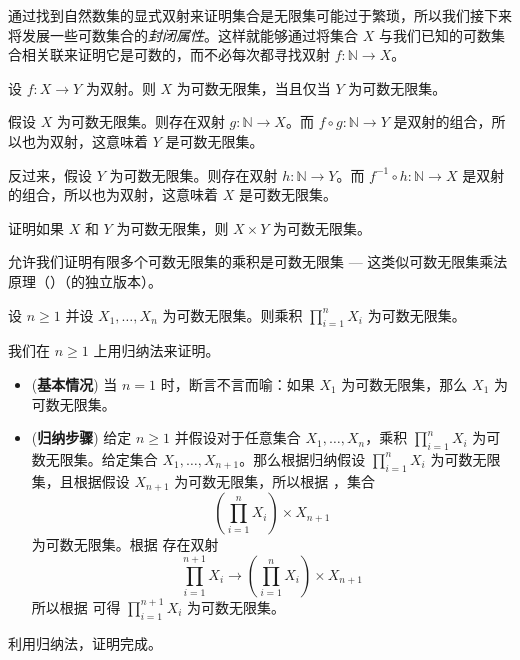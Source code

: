 通过找到自然数集的显式双射来证明集合是无限集可能过于繁琐，所以我们接下来将发展一些可数集合的\textit{封闭属性}。这样就能够通过将集合 $X$ 与我们已知的可数集合相关联来证明它是可数的，而不必每次都寻找双射 $f : \mathbb{N} \to X$。

\begin{proposition}
\label{propCountablyInfiniteFromBijection}
设 $f : X \to Y$ 为双射。则 $X$ 为可数无限集，当且仅当 $Y$ 为可数无限集。
\end{proposition}

\begin{cproof}
假设 $X$ 为可数无限集。则存在双射 $g : \mathbb{N} \to X$。而 $f \circ g : \mathbb{N} \to Y$ 是双射的组合，所以也为双射，这意味着 $Y$ 是可数无限集。

反过来，假设 $Y$ 为可数无限集。则存在双射 $h : \mathbb{N} \to Y$。而 $f^{-1} \circ h : \mathbb{N} \to X$ 是双射的组合，所以也为双射，这意味着 $X$ 是可数无限集。
\end{cproof}

\begin{exercise}
证明如果 $X$ 和 $Y$ 为可数无限集，则 $X \times Y$ 为可数无限集。
\end{exercise}

 允许我们证明有限多个可数无限集的乘积是可数无限集 --- 这类似可数无限集乘法原理（）（的独立版本）。

\begin{proposition}[有限多个可数集合的乘积是可数的]
\label{propFiniteProductOfCountableSetsIsCountable}
设 $n \ge 1$ 并设 $X_1, \dots, X_n$ 为可数无限集。则乘积 $\displaystyle \prod_{i=1}^n X_i$ 为可数无限集。
\end{proposition}
\begin{cproof}
我们在 $n \ge 1$ 上用归纳法来证明。
\begin{itemize}
\item (\textbf{基本情况}) 当 $n=1$ 时，断言不言而喻：如果 $X_1$ 为可数无限集，那么 $X_1$ 为可数无限集。
\item (\textbf{归纳步骤}) 给定 $n \ge 1$ 并假设对于任意集合 $X_1, \dots, X_n$，乘积 $\prod_{i=1}^n X_i$ 为可数无限集。给定集合 $X_1, \dots, X_{n+1}$。那么根据归纳假设 $\prod_{i=1}^n X_i$ 为可数无限集，且根据假设 $X_{n+1}$ 为可数无限集，所以根据 ，集合
\[ \left( \prod_{i=1}^n X_i \right) \times X_{n+1} \]
为可数无限集。根据  存在双射
\[ \prod_{i=1}^{n+1} X_i \to \left( \prod_{i=1}^n X_i \right) \times X_{n+1} \]
所以根据  可得 $\prod_{i=1}^{n+1} X_i$ 为可数无限集。
\end{itemize}
利用归纳法，证明完成。
\end{cproof}

